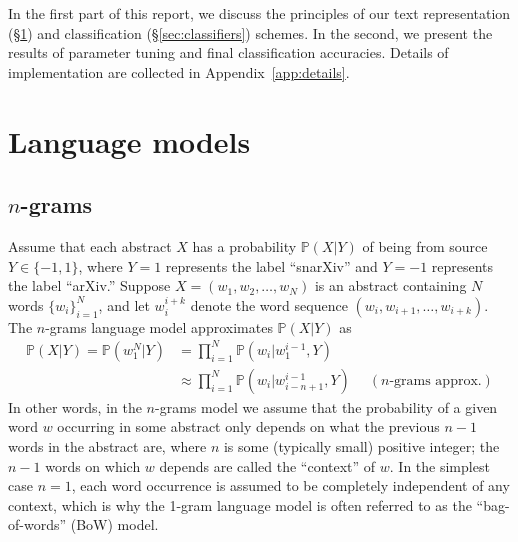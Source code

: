 \documentclass{article}
\renewcommand{\P}{\mathbb{P}}
\begin{document}
In the first part of this report, we discuss the principles of our text representation (\S\ref{sec:LMs}) and classification (\S\ref{sec:classifiers}) schemes.
In the second, we present the results of parameter tuning and final classification accuracies. Details of implementation are collected in Appendix~\ref{app:details}.







 
\section{Language models} \label{sec:LMs}
\subsection{\texorpdfstring{$n$-grams}{n-grams}} \label{sec:n-grams}
Assume that each abstract $X$ has a probability $\P(X|Y)$ of being from source $Y\in\{-1,1\}$, where $Y=1$ represents the label ``snarXiv'' and  $Y=-1$ represents the label ``arXiv.''
Suppose $X=(w_1,w_2,\ldots,w_N)$ is an abstract containing $N$ words $\{w_i\}_{i=1}^N$, and let $w_i^{i+k}$ denote the word sequence $(w_i,w_{i+1},\ldots, w_{i+k})$.
The $n$-grams language model approximates $\P(X|Y)$ as
\begin{align}
  \P(X|Y) = \P(w_1^N|Y) &= \prod_{i=1}^N \P(w_i|w_1^{i-1},Y)
  \\
  &\approx \prod_{i=1}^N \P(w_i| w_{i-n+1}^{i-1},Y) \quad\; (n\text{-grams approx.})
\end{align}
In other words, in the $n$-grams model we assume that the probability of a given word $w$ occurring in some abstract only depends on what the previous $n-1$ words in the abstract are, where $n$ is some (typically small) positive integer; the $n-1$ words on which $w$ depends are called the ``context'' of $w$.
In the simplest case $n=1$, each word occurrence is assumed to be completely independent of any context, which is why the 1-gram language model is often referred to as the ``bag-of-words'' (BoW) model.
\end{document}
